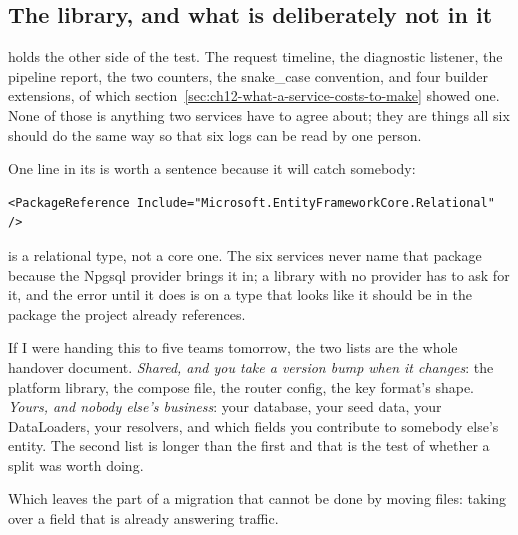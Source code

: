 \subsection*{The library, and what is deliberately not in it}

%
 holds the other side of the test. The request
timeline, the diagnostic listener, the pipeline report, the two counters, the
snake\_case convention, and four builder extensions, of which
section~\ref{sec:ch12-what-a-service-costs-to-make} showed one. None of those is
anything two services have to agree about; they are things all six should do the
same way so that six logs can be read by one person.

One line in its  is worth a sentence because it will catch
somebody:

\begin{verbatim}
<PackageReference Include="Microsoft.EntityFrameworkCore.Relational" />
\end{verbatim}

 is a relational type, not a core one. The six
services never name that package because the Npgsql provider brings it in; a
library with no provider has to ask for it, and the error until it does is
 on a type that looks like it should be in the package the project
already references.

%
If I were handing this to five teams tomorrow, the two lists are the whole
handover document. \emph{Shared, and you take a version bump when it changes}:
the platform library, the compose file, the router config, the key format's
shape. \emph{Yours, and nobody else's business}: your database, your seed data,
your DataLoaders, your resolvers, and which fields you contribute to somebody
else's entity. The second list is longer than the first and that is the test of
whether a split was worth doing.

\medskip
Which leaves the part of a migration that cannot be done by moving files: taking
over a field that is already answering traffic.

%
